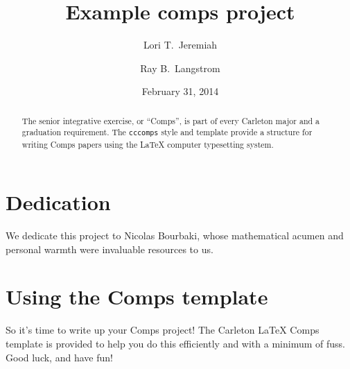 \documentclass[twoside]{memoir}
\title{Example comps project}
\author{Lori T.~Jeremiah \and Ray B.~Langstrom} %
\date{February 31, 2014}
\newcommand{\code}[1]{\texttt{#1}}
\begin{document}
\frontmatter

\maketitle

\chapter{Dedication}
We dedicate this project to Nicolas Bourbaki, whose mathematical acumen and personal warmth were invaluable resources to us.

\begin{abstract}
  The senior integrative exercise, or \enquote{Comps}, is part of every Carleton major and a graduation requirement.
  The \code{cccomps} style and template provide a structure for writing Comps papers using the \LaTeX{} computer typesetting system.
\end{abstract}

\tableofcontents


\mainmatter

\chapter{Using the Comps template}
\label{s:usingtemplate}
So it's time to write up your Comps project!
The Carleton \LaTeX{} Comps template is provided to help you do this efficiently and with a minimum of fuss.
Good luck, and have fun!
\end{document}
